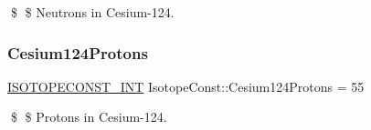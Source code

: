 \$ \$ Neutrons in Cesium-\/124. \mbox{\label{group___isotope_const-_cesium-_cs124_ga92e2fb7dc1d0fa5cac7d67637e5c98b9}} 
\subsubsection{\texorpdfstring{Cesium124\+Protons}{Cesium124Protons}}
{\footnotesize\ttfamily \mbox{\hyperlink{group___isotope_const-_macros_ga5f18360b3e99483a35c32d789e62621c}{I\+S\+O\+T\+O\+P\+E\+C\+O\+N\+S\+T\+\_\+\+I\+NT}} Isotope\+Const\+::\+Cesium124\+Protons = 55}

\$ \$ Protons in Cesium-\/124. 